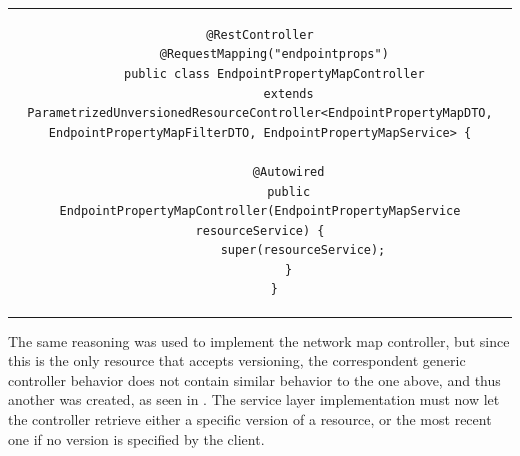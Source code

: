 \begin{center}
\begin{tabular}{c}
\begin{lstlisting}[caption=Concrete controller extending from a parametrized one, label={lst:endpoint-property-map-controller}]
    @RestController
    @RequestMapping("endpointprops")
    public class EndpointPropertyMapController
        extends ParametrizedUnversionedResourceController<EndpointPropertyMapDTO, EndpointPropertyMapFilterDTO, EndpointPropertyMapService> {

        @Autowired
        public EndpointPropertyMapController(EndpointPropertyMapService resourceService) {
            super(resourceService);
        }
    }

\end{lstlisting}
\end{tabular}
\end{center}

    The same reasoning was used to implement the network map controller, but since this is the only resource that accepts versioning, the correspondent generic controller behavior does not contain similar behavior to the one above, and thus another was created, as seen in \cite{lst:versioned-controller}.
    The service layer implementation must now let the controller retrieve either a specific version of a resource, or the most recent one if no version is specified by the client.



